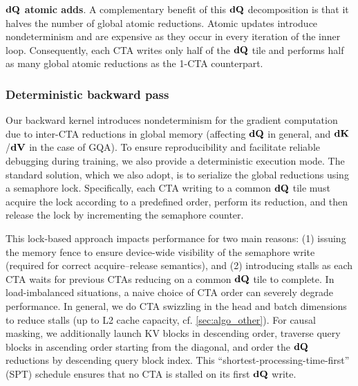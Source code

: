 \textbf{$\mathbf{dQ}$ atomic adds}. A complementary benefit of this $\mathbf{dQ}$ decomposition is that it halves the number of global atomic reductions. Atomic updates introduce nondeterminism and are expensive as they occur in every iteration of the inner loop. Consequently, each CTA writes only half of the $\mathbf{dQ}$ tile and performs half as many global atomic reductions as the 1-CTA counterpart.



\subsubsection{Deterministic backward pass} 

Our backward kernel introduces nondeterminism for the gradient computation due to inter-CTA reductions in global memory (affecting $\mathbf{dQ}$ in general, and $\mathbf{dK}$/$\mathbf{dV}$ in the case of GQA). To ensure reproducibility and facilitate reliable debugging during training, we also provide a deterministic execution mode. The standard solution, which we also adopt, is to serialize the global reductions using a semaphore lock. Specifically, each CTA writing to a common $\mathbf{dQ}$ tile must acquire the lock according to a predefined order, perform its reduction, and then release the lock by incrementing the semaphore counter. 

This lock-based approach impacts performance for two main reasons: (1) issuing the memory fence to ensure device-wide visibility of the semaphore write (required for correct acquire--release semantics), and (2) introducing stalls as each CTA waits for previous CTAs reducing on a common $\mathbf{dQ}$ tile to complete. In load-imbalanced situations, a naive choice of CTA order can severely degrade performance. In general, we do CTA swizzling in the head and batch dimensions to reduce stalls (up to L2 cache capacity, cf. \cref{sec:algo_other}). For causal masking, we additionally launch KV blocks in descending order, traverse query blocks in ascending order starting from the diagonal, and order the $
\mathbf{dQ}$ reductions by descending query block index. This ``shortest-processing-time-first'' (SPT) schedule ensures that no CTA is stalled on its first $\mathbf{dQ}$ write.

